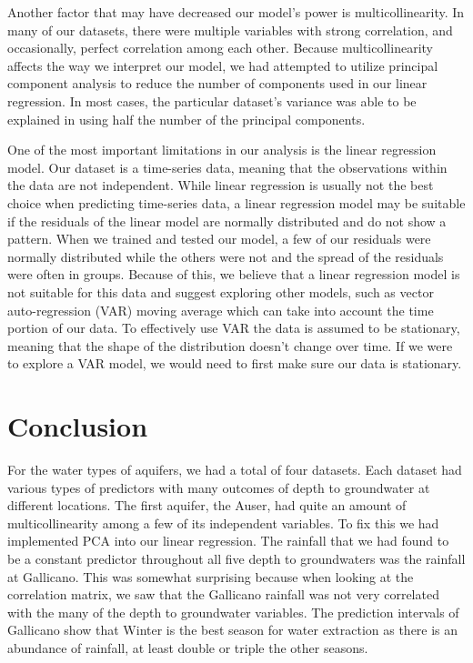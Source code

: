 \documentclass[12pt, letterpaper]{article}
\begin{document}
Another factor that may have decreased our model’s power is multicollinearity. In many of our datasets, there were multiple variables with strong correlation, and occasionally, perfect correlation among each other. Because multicollinearity affects the way we interpret our model, we had attempted to utilize principal component analysis to reduce the number of components used in our linear regression. In most cases, the particular dataset’s variance was able to be explained in using half the number of the principal components. 

One of the most important limitations in our analysis is the linear regression model. Our dataset is a time-series data, meaning that the observations within the data are not independent. While linear regression is usually not the best choice when predicting time-series data, a linear regression model may be suitable if the residuals of the linear model are normally distributed and do not show a pattern. When we trained and tested our model, a few of our residuals were normally distributed while the others were not and the spread of the residuals were often in groups. Because of this, we believe that a linear regression model is not suitable for this data and suggest exploring other models, such as vector auto-regression (VAR) moving average which can take into account the time portion of our data. To effectively use VAR the data is assumed to be stationary, meaning that the shape of the distribution doesn’t change over time. If we were to explore a VAR model, we would need to first make sure our data is stationary.

\section{Conclusion}
For the water types of aquifers, we had a total of four datasets. Each dataset had various types of predictors with many outcomes of depth to groundwater at different locations. The first aquifer, the Auser, had quite an amount of multicollinearity among a few of its independent variables. To fix this we had implemented PCA into our linear regression. The rainfall that we had found to be a constant predictor throughout all five depth to groundwaters was the rainfall at Gallicano. This was somewhat surprising because when looking at the correlation matrix, we saw that the Gallicano rainfall was not very correlated with the many of the depth to groundwater variables. The prediction intervals of Gallicano show that Winter is the best season for water extraction as there is an abundance of rainfall, at least double or triple the other seasons. 
\end{document}
